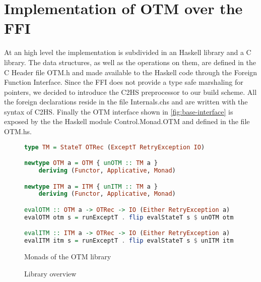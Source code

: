 
\chapter{Implementation of OTM over the FFI}

\label{chap:implementation}
At an high level the implementation is subdivided in an Haskell library and a C library.
The data structures, as well as the operations on them, are defined in the C Header file OTM.h and made available to the Haskell code through the Foreign Function Interface.
Since the FFI does not provide a type safe marshaling for pointers, we decided to introduce the C2HS preprocessor to our build scheme.
All the foreign declarations reside in the file Internals.chs and are written with the syntax of C2HS.\cite{Chakravarty2000}
Finally the OTM interface shown in \cref{fig:base-interface} is exposed by the the Haskell module Control.Monad.OTM and defined in the file OTM.hs.

\begin{figure}
\begin{minipage}[b]{0.7\textwidth}
    \begin{lstlisting}[language=Haskell]
type TM = StateT OTRec (ExceptT RetryException IO)

newtype OTM a = OTM { unOTM :: TM a }
    deriving (Functor, Applicative, Monad)

newtype ITM a = ITM { unITM :: TM a }
    deriving (Functor, Applicative, Monad)

evalOTM :: OTM a -> OTRec -> IO (Either RetryException a)
evalOTM otm s = runExceptT . flip evalStateT s $ unOTM otm

evalITM :: ITM a -> OTRec -> IO (Either RetryException a)
evalITM itm s = runExceptT . flip evalStateT s $ unITM itm
    \end{lstlisting}
    \caption{Monads of the OTM library}
    \label{fig:monads}
\end{minipage}
%
\begin{minipage}[b]{0.3\textwidth}
    \centering
    \caption{Library overview}
\end{minipage}
\end{figure}

